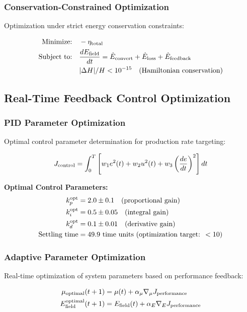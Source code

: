 \documentclass[11pt,a4paper]{article}
\begin{document}
{{{{{\subsubsection{Conservation-Constrained Optimization}
Optimization under strict energy conservation constraints:

\begin{align}
\text{Minimize:} \quad &-\eta_{\rm total} \\
\text{Subject to:} \quad &\frac{dE_{\rm field}}{dt} = \dot{E}_{\rm convert} + \dot{E}_{\rm loss} + \dot{E}_{\rm feedback} \\
&|\Delta H|/H < 10^{-15} \quad \text{(Hamiltonian conservation)}
\end{align}

\subsection{Real-Time Feedback Control Optimization}

\subsubsection{PID Parameter Optimization}
Optimal control parameter determination for production rate targeting:

\begin{equation}
J_{\rm control} = \int_0^T \left[w_1 e^2(t) + w_2 u^2(t) + w_3 \left(\frac{de}{dt}\right)^2\right] dt
\end{equation}

\textbf{Optimal Control Parameters:}
\begin{align}
k_p^{\rm opt} &= 2.0 \pm 0.1 \quad \text{(proportional gain)} \\
k_i^{\rm opt} &= 0.5 \pm 0.05 \quad \text{(integral gain)} \\
k_d^{\rm opt} &= 0.1 \pm 0.01 \quad \text{(derivative gain)} \\
\text{Settling time} &= 49.9 \text{ time units (optimization target: } < 10 \text{)}
\end{align}

\subsubsection{Adaptive Parameter Optimization}
Real-time optimization of system parameters based on performance feedback:

\begin{align}
\mu_{\rm optimal}(t+1) &= \mu(t) + \alpha_\mu \nabla_\mu J_{\rm performance} \\
E_{\rm field}^{\rm optimal}(t+1) &= E_{\rm field}(t) + \alpha_E \nabla_E J_{\rm performance}
\end{align}

}}}}}
\end{document}
